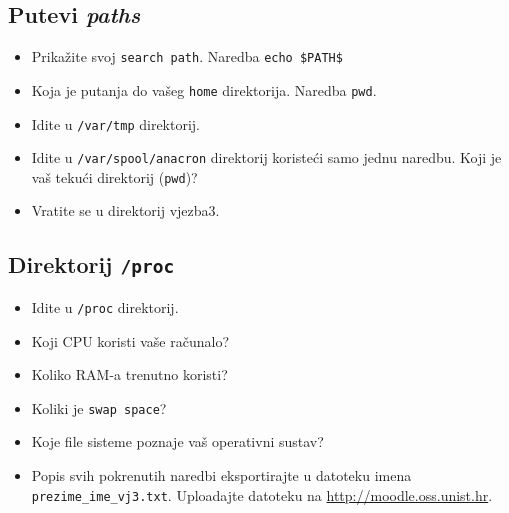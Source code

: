 \subsection*{Putevi \textit{paths}}
\begin{itemize}
 \item Prikažite svoj \texttt{search path}. Naredba \texttt{echo \$PATH\$}
\item Koja je putanja do vašeg \texttt{home} direktorija. Naredba \texttt{pwd}. 
\item Idite u \texttt{/var/tmp} direktorij.
\item Idite u \texttt{/var/spool/anacron} direktorij koristeći samo jednu naredbu. Koji je vaš tekući direktorij (\texttt{pwd})?
\item Vratite se u direktorij vjezba3.
\end{itemize}

\subsection*{Direktorij \texttt{/proc} }
\begin{itemize}
 \item Idite u \texttt{/proc} direktorij.
\item Koji CPU koristi vaše računalo?
\item Koliko RAM-a trenutno koristi?
\item Koliki je \texttt{swap space}?
\item Koje file sisteme poznaje vaš operativni sustav?
\end{itemize}

\vfill
\begin{itemize}
\renewcommand{\labelitemi}{\textbf{$\rightarrow$}}
\item Popis svih pokrenutih naredbi eksportirajte u datoteku imena \texttt{prezime\_ime\_vj3.txt}. Uploadajte datoteku na \href{https://moodle.oss.unist.hr/course/view.php?id=133}{http://moodle.oss.unist.hr}.
\end{itemize}
